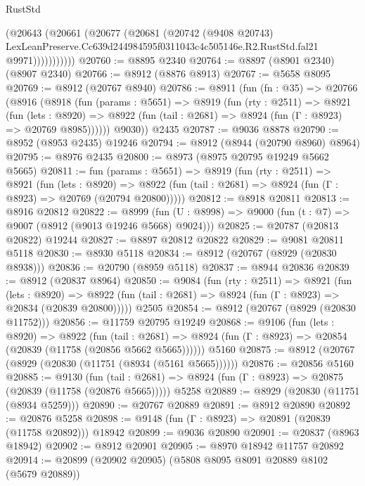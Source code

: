 \begin{lexlean}{RustStd}
\begin{coremodule}
                (@20643
                  (@20661
                    (@20677
                      (@20681
                        (@20742
                          (@9408 @20743)
                          LexLeanPreserve.Cc639d244984595f0311043c4c505146e.R2.RustStd.fal21
                          @9971)))))))))))
@20760 := @8895 @2340
@20764 := @8897 (@8901 @2340) (@8907 @2340)
@20766 := @8912 (@8876 @8913)
@20767 := @5658 @8095
@20769 := @8912 (@20767 @8940)
@20786 := @8911
    (fun (fn : @35) =>
    @20766
      (@8916
        (@8918
          (fun (params : @5651) =>
          @8919
            (fun (rty : @2511) =>
            @8921
              (fun (lets : @8920) =>
              @8922 (fun (tail : @2681) => @8924 (fun (Γ : @8923) => @20769 @8985))))))
        @9030))
    @2435
@20787 := @9036 @8878
@20790 := @8952 (@8953 @2435) @19246
@20794 := @8912 (@8944 (@20790 @8960) @8964)
@20795 := @8976 @2435
@20800 := @8973 (@8975 @20795 @19249 @5662 @5665)
@20811 := fun (params : @5651) =>
  @8919
    (fun (rty : @2511) =>
    @8921
      (fun (lets : @8920) =>
      @8922 (fun (tail : @2681) => @8924 (fun (Γ : @8923) => @20769 (@20794 @20800)))))
@20812 := @8918 @20811
@20813 := @8916 @20812
@20822 := @8999
    (fun (U : @8998) => @9000 (fun (t : @7) => @9007 (@8912 (@9013 @19246 @5668) @9024)))
@20825 := @20787 (@20813 @20822) @19244
@20827 := @8897 @20812 @20822
@20829 := @9081 @20811 @5118
@20830 := @8930 @5118
@20834 := @8912 (@20767 (@8929 (@20830 @8938)))
@20836 := @20790 (@8959 @5118)
@20837 := @8944 @20836
@20839 := @8912 (@20837 @8964)
@20850 := @9084
    (fun (rty : @2511) =>
    @8921
      (fun (lets : @8920) =>
      @8922 (fun (tail : @2681) => @8924 (fun (Γ : @8923) => @20834 (@20839 @20800)))))
    @2505
@20854 := @8912 (@20767 (@8929 (@20830 @11752)))
@20856 := @11759 @20795 @19249
@20868 := @9106
    (fun (lets : @8920) =>
    @8922
      (fun (tail : @2681) =>
      @8924 (fun (Γ : @8923) => @20854 (@20839 (@11758 (@20856 @5662 @5665))))))
    @5160
@20875 := @8912 (@20767 (@8929 (@20830 (@11751 (@8934 (@5161 @5665))))))
@20876 := @20856 @5160
@20885 := @9130
    (fun (tail : @2681) => @8924 (fun (Γ : @8923) => @20875 (@20839 (@11758 (@20876 @5665)))))
    @5258
@20889 := @8929 (@20830 (@11751 (@8934 @5259)))
@20890 := @20767 @20889
@20891 := @8912 @20890
@20892 := @20876 @5258
@20898 := @9148 (fun (Γ : @8923) => @20891 (@20839 (@11758 @20892))) @18942
@20899 := @9036 @20890
@20901 := @20837 (@8963 @18942)
@20902 := @8912 @20901
@20905 := @8970 @18942 @11757 @20892
@20914 := @20899 (@20902 @20905) (@5808 @8095 @8091 @20889 @8102 (@5679 @20889))

\end{coremodule}
\end{lexlean}
